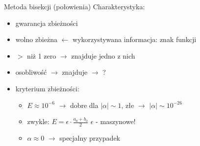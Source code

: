 \begin{frame}{Metoda bisekcji (połowienia)}
	Charakterystyka:
	\begin{itemize}
		\item gwarancja zbieżności
		\item wolno zbieżna $\leftarrow$ wykorzystywana informacja: znak funkcji
		\item $>$ niż 1 zero $\rightarrow$ znajduje jedno z nich
		\item osobliwość $\rightarrow$ znajduje $\rightarrow$ ?
		\item kryterium zbieżności:
		\begin{itemize}
			\item $E \approx 10^{-6}$ $\rightarrow$ dobre dla $\lvert\alpha\rvert \sim 1$, złe $\rightarrow$ $\lvert\alpha\rvert \sim 10^{-26}$
			\item zwykle: $E = \epsilon \cdot \frac{a_{0} + b_{0}}{2}$ \quad $\epsilon$ - maszynowe!
			\item $\alpha \approx 0$ $\rightarrow$ specjalny przypadek
		\end{itemize}
	\end{itemize}
\end{frame}
